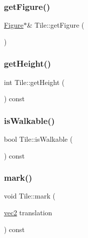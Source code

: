 \subsubsection{\texorpdfstring{get\+Figure()}{getFigure()}}
{\footnotesize\ttfamily \hyperlink{classFigure}{Figure}$\ast$\& Tile\+::get\+Figure (\begin{DoxyParamCaption}{ }\end{DoxyParamCaption})\hspace{0.3cm}{\ttfamily [inline]}}

\mbox{\label{classTile_a8ff17f88b15ff106a8df470df9b4bda6}} 
\subsubsection{\texorpdfstring{get\+Height()}{getHeight()}}
{\footnotesize\ttfamily int Tile\+::get\+Height (\begin{DoxyParamCaption}{ }\end{DoxyParamCaption}) const\hspace{0.3cm}{\ttfamily [inline]}}

\mbox{\label{classTile_a2f9971efdf7b36249a491ca7ceb2ef57}} 
\subsubsection{\texorpdfstring{is\+Walkable()}{isWalkable()}}
{\footnotesize\ttfamily bool Tile\+::is\+Walkable (\begin{DoxyParamCaption}{ }\end{DoxyParamCaption}) const\hspace{0.3cm}{\ttfamily [inline]}}

\mbox{\label{classTile_afe81f76a0c23b9050990e0f10eb4128f}} 
\subsubsection{\texorpdfstring{mark()}{mark()}}
{\footnotesize\ttfamily void Tile\+::mark (\begin{DoxyParamCaption}\item[{\hyperlink{structvec2}{vec2}}]{translation }\end{DoxyParamCaption}) const}

